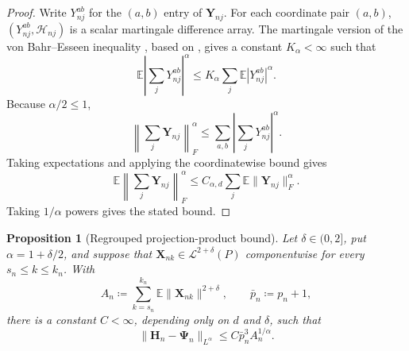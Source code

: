 \documentclass[11pt]{article}
\renewcommand\vec[1]{\boldsymbol{#1}}
\newcommand\mat[1]{\mathbf{#1}}
\newcommand{\E}{\mathbb{E}}
\newcommand{\Hcal}{\mathcal{H}}
\renewcommand{\L}{\mathcal{L}}
\newtheorem{proposition}{Proposition}
\theoremstyle{definition}
\begin{document}
\begin{proof}
Write \(Y_{nj}^{ab}\) for the \((a,b)\) entry of \(\mat{Y}_{nj}\).
For each coordinate pair \((a,b)\), \((Y_{nj}^{ab},\Hcal_{nj})\) is a scalar martingale difference array.
The martingale version of the von Bahr--Esseen inequality \citep[Theorem 2.10]{hall_martingale_1980}, based on \citet{vonbahr_esseen_1965}, gives a constant \(K_\alpha<\infty\) such that
\[
\E\left|\sum_jY_{nj}^{ab}\right|^\alpha
\leq
K_\alpha\sum_j\E|Y_{nj}^{ab}|^\alpha.
\]
Because \(\alpha/2\leq1\),
\[
\left\|\sum_j\mat{Y}_{nj}\right\|_F^\alpha
\leq
\sum_{a,b}\left|\sum_jY_{nj}^{ab}\right|^\alpha.
\]
Taking expectations and applying the coordinatewise bound gives
\[
\E\left\|\sum_j\mat{Y}_{nj}\right\|_F^\alpha
\leq
C_{\alpha,d}\sum_j\E\|\mat{Y}_{nj}\|_F^\alpha.
\]
Taking \(1/\alpha\) powers gives the stated bound.
\end{proof}

\begin{proposition}[Regrouped projection-product bound]\label{prop:regrouped-bound}
Let \(\delta\in(0,2]\), put \(\alpha=1+\delta/2\), and suppose that \(\vec{X}_{nk}\in\L^{2+\delta}(P)\) componentwise for every \(s_n\leq k\leq k_n\).
With
\[
A_n\coloneqq\sum_{k=s_n}^{k_n}\E\|\vec{X}_{nk}\|^{2+\delta},
\qquad
\bar p_n\coloneqq p_n+1,
\]
there is a constant \(C<\infty\), depending only on \(d\) and \(\delta\), such that
\[
\|\mat{H}_n-\mat{\Psi}_n\|_{L^\alpha}
\leq
C\bar p_n^3 A_n^{1/\alpha}.
\]
\end{proposition}
\end{document}
